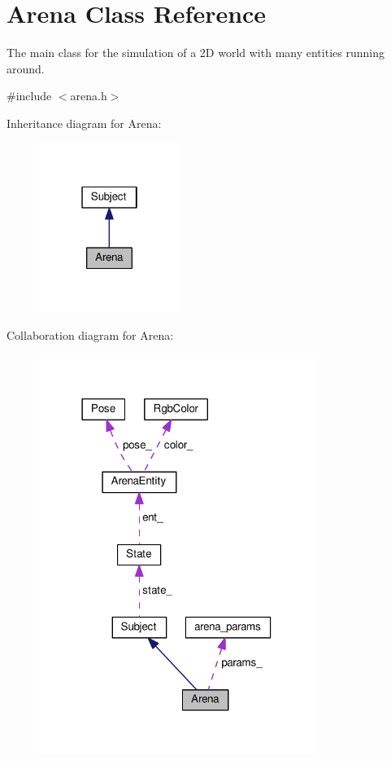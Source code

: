 \hypertarget{classArena}{}\section{Arena Class Reference}
\label{classArena}


The main class for the simulation of a 2D world with many entities running around.  




{\ttfamily \#include $<$arena.\+h$>$}



Inheritance diagram for Arena\+:\nopagebreak
\begin{figure}[H]
\begin{center}
\leavevmode
\includegraphics[width=130pt]{classArena__inherit__graph}
\end{center}
\end{figure}


Collaboration diagram for Arena\+:\nopagebreak
\begin{figure}[H]
\begin{center}
\leavevmode
\includegraphics[width=254pt]{classArena__coll__graph}
\end{center}
\end{figure}
